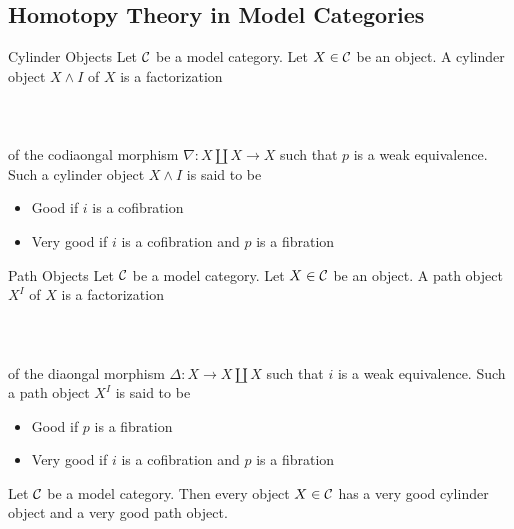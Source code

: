 \documentclass[a4paper]{article}
\begin{document}
\subsection{Homotopy Theory in Model Categories}
\begin{defn}{Cylinder Objects}{} Let $\mathcal{C}$ be a model category. Let $X\in\mathcal{C}$ be an object. A cylinder object $X\wedge I$ of $X$ is a factorization \\~\\
\\~\\
of the codiaongal morphism $\nabla:X\coprod X\to X$ such that $p$ is a weak equivalence. Such a cylinder object $X\wedge I$ is said to be 
\begin{itemize}
\item Good if $i$ is a cofibration
\item Very good if $i$ is a cofibration and $p$ is a fibration
\end{itemize}
\end{defn}

\begin{defn}{Path Objects}{} Let $\mathcal{C}$ be a model category. Let $X\in\mathcal{C}$ be an object. A path object $X^I$ of $X$ is a factorization \\~\\
\\~\\
of the diaongal morphism $\Delta:X\to X\coprod X$ such that $i$ is a weak equivalence. Such a path object $X^I$ is said to be 
\begin{itemize}
\item Good if $p$ is a fibration
\item Very good if $i$ is a cofibration and $p$ is a fibration
\end{itemize}
\end{defn}

\begin{lmm}{}{} Let $\mathcal{C}$ be a model category. Then every object $X\in\mathcal{C}$ has a very good cylinder object and a very good path object. 
\end{lmm}
\end{document}
